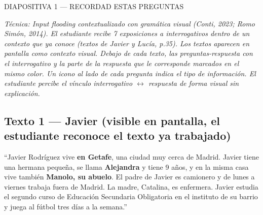 \documentclass[a4paper,10pt]{article}
\newcommand{\diapheader}[2]{%
  \noindent\begin{tcolorbox}[
    colback=naranja,
    colframe=naranja,
    coltext=white,
    fontupper=\bfseries\large,
    boxrule=0pt,
    arc=3pt,
    left=6pt, right=6pt, top=4pt, bottom=4pt
  ]
  DIAPOSITIVA #1 — #2
  \end{tcolorbox}
}
\begin{document}
\newpage


\diapheader{1}{RECORDAD ESTAS PREGUNTAS}

\vspace{0.2cm}

\begin{marsbox}
\textit{Técnica: Input flooding contextualizado con gramática visual (Conti, 2023; Romo Simón, 2014). El estudiante recibe 7 exposiciones a interrogativos dentro de un contexto que ya conoce (textos de Javier y Lucía, p.35). Los textos aparecen en pantalla como contexto visual. Debajo de cada texto, las preguntas-respuesta con el interrogativo y la parte de la respuesta que le corresponde marcados en el mismo color. Un icono al lado de cada pregunta indica el tipo de información. El estudiante percibe el vínculo interrogativo $\leftrightarrow$ respuesta de forma visual sin explicación.}
\end{marsbox}

\vspace{0.2cm}

\begin{center}
{\small
{}}
\end{center}

\vspace{0.3cm}

\subsection*{\textcolor{naranja}{Texto 1 --- Javier} {\small (visible en pantalla, el estudiante reconoce el texto ya trabajado)}}

{\small
``Javier Rodríguez vive \textcolor{verde}{\textbf{en Getafe}}, una ciudad muy cerca de Madrid. Javier tiene una hermana pequeña, se llama \textcolor{colornaranja}{\textbf{Alejandra}} y tiene 9 años, y en la misma casa vive también \textcolor{rojo}{\textbf{Manolo, su abuelo}}. El padre de Javier es camionero y de lunes a viernes trabaja fuera de Madrid. La madre, Catalina, es enfermera. Javier estudia el segundo curso de Educación Secundaria Obligatoria en el instituto de su barrio y juega al fútbol tres días a la semana.''}
\end{document}
